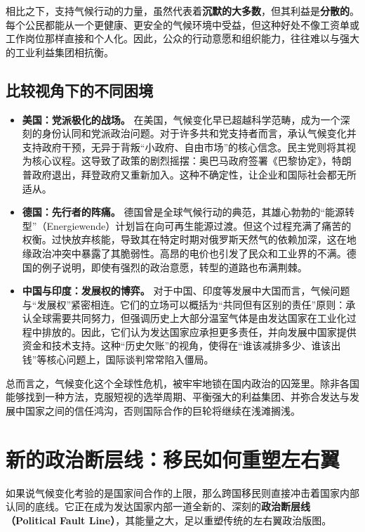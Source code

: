 \documentclass[a5paper, 11pt, openany]{ctexbook}
\begin{document}
相比之下，支持气候行动的力量，虽然代表着\textbf{沉默的大多数}，但其利益是\textbf{分散的}。每个公民都能从一个更健康、更安全的气候环境中受益，但这种好处不像工资单或工作岗位那样直接和个人化。因此，公众的行动意愿和组织能力，往往难以与强大的工业利益集团相抗衡。

\subsection{比较视角下的不同困境}

\begin{itemize}
    \item \textbf{美国：党派极化的战场。} 在美国，气候变化早已超越科学范畴，成为一个深刻的身份认同和党派政治问题。对于许多共和党支持者而言，承认气候变化并支持政府干预，无异于背叛“小政府、自由市场”的核心信念。民主党则将其视为核心议程。这导致了政策的剧烈摇摆：奥巴马政府签署《巴黎协定》，特朗普政府退出，拜登政府又重新加入。这种不确定性，让企业和国际社会都无所适从。
    \item \textbf{德国：先行者的阵痛。} 德国曾是全球气候行动的典范，其雄心勃勃的“能源转型”（Energiewende）计划旨在向可再生能源过渡。但这个过程充满了痛苦的权衡。过快放弃核能，导致其在特定时期对俄罗斯天然气的依赖加深，这在地缘政治冲突中暴露了其脆弱性。高昂的电价也引发了民众和工业界的不满。德国的例子说明，即使有强烈的政治意愿，转型的道路也布满荆棘。
    \item \textbf{中国与印度：发展权的博弈。} 对于中国、印度等发展中大国而言，气候问题与“发展权”紧密相连。它们的立场可以概括为“共同但有区别的责任”原则：承认全球需要共同努力，但强调历史上大部分温室气体是由发达国家在工业化过程中排放的。因此，它们认为发达国家应承担更多责任，并向发展中国家提供资金和技术支持。这种“历史欠账”的视角，使得在“谁该减排多少、谁该出钱”等核心问题上，国际谈判常常陷入僵局。
\end{itemize}

总而言之，气候变化这个全球性危机，被牢牢地锁在国内政治的囚笼里。除非各国能够找到一种方法，克服短视的选举周期、平衡强大的利益集团、并弥合发达与发展中国家之间的信任鸿沟，否则国际合作的巨轮将继续在浅滩搁浅。

\section{新的政治断层线：移民如何重塑左右翼}

如果说气候变化考验的是国家间合作的上限，那么跨国移民则直接冲击着国家内部认同的底线。它正在成为发达国家内部一道全新的、深刻的\textbf{政治断层线（Political Fault Line）}，其能量之大，足以重塑传统的左右翼政治版图。
\end{document}
